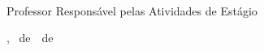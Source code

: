 \vspace{2\baselineskip plus 1.5\baselineskip minus 0.5\baselineskip}

\begin{flushright}%
	\begin{minipage}{0.5\textwidth}%
		\@prae\\\vspace{-0.5cm}
		\begin{flushright}
			Professor Responsável pelas Atividades de Estágio
		\end{flushright}		
	\end{minipage}
\end{flushright}

\vfill%
\begin{center}
	\@cidade, \@diaDefesa~de~\@mesDefesa~de~\anovalor
\end{center}

